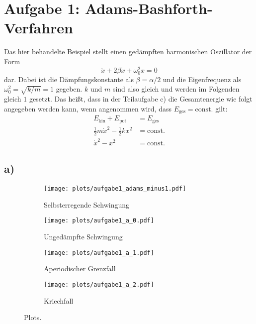 \newpage
\section{Aufgabe 1: Adams-Bashforth-Verfahren}
\label{sec:auf1}
  Das hier behandelte Beispiel stellt einen gedämpften harmonischen Oszillator der Form
  \begin{equation}
      \ddot{x} + 2 \beta \dot{x} + \omega_0^2 x = 0
  \end{equation}
  dar.
  Dabei ist die Dämpfungskonstante als $\beta = \alpha / 2$ und die Eigenfrequenz als $\omega_0^2 = \sqrt{k/m} = 1$ gegeben.
  $k$ und $m$ sind also gleich und werden im Folgenden gleich $1$ gesetzt.
  Das heißt, dass in der Teilaufgabe c) die Gesamtenergie wie folgt angegeben werden kann, wenn angenommen wird, dass $E_{\mathrm{ges}} = \mathrm{const.}$ gilt:
  \begin{align}
      E_{\mathrm{kin}} + E_{\mathrm{pot}} &= E_{\mathrm{ges}} \\[3pt]
      \frac{1}{2} m \dot{x}^2 - \frac{1}{2} k x^2 &= \mathrm{const.} \\
      \dot{x}^2 - x^2 &= \mathrm{const.}
      \label{eqn:gesamtenergie}
  \end{align}

\subsection*{a)}
  \begin{figure}[ht]
    \centering
    \begin{subfigure}{0.49\textwidth}
      \texttt{[image: plots/aufgabe1\_adams\_minus1.pdf]} \vspace*{-0.7cm}
      \caption{Selbsterregende Schwingung}
      \label{fig:aufgabe1_adams_minus1}
    \end{subfigure}
    \hfill
    \begin{subfigure}{0.49\textwidth}
      \texttt{[image: plots/aufgabe1\_a\_0.pdf]} \vspace*{-0.7cm}
      \caption{Ungedämpfte Schwingung}
      \label{fig:aufgabe1_a_0}
    \end{subfigure}
    \begin{subfigure}{0.49\textwidth}
      \texttt{[image: plots/aufgabe1\_a\_1.pdf]} \vspace*{-0.7cm}
      \caption{Aperiodischer Grenzfall}
      \label{fig:aufgabe1_a_1}
    \end{subfigure}
    \hfill
    \begin{subfigure}{0.49\textwidth}
      \texttt{[image: plots/aufgabe1\_a\_2.pdf]} \vspace*{-0.7cm}
      \caption{Kriechfall}
      \label{fig:aufgabe1_a_2}
    \end{subfigure}
    
    \caption{Plots.}
    \label{fig:aufgabe1_a}    

  \end{figure}
\FloatBarrier

